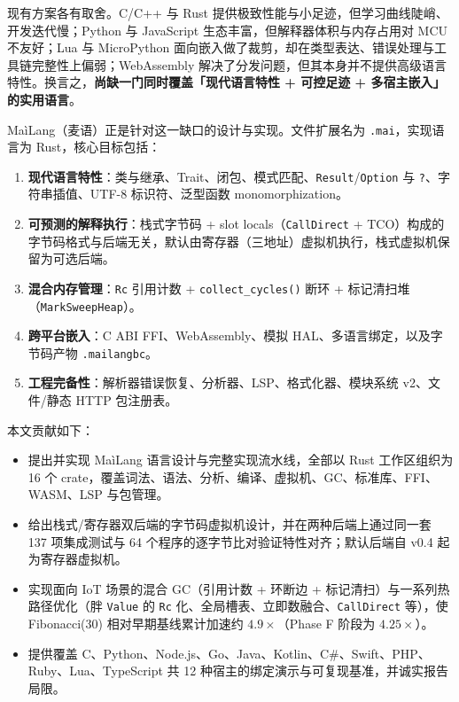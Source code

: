 \documentclass[10pt,a4paper]{article}
\begin{document}
现有方案各有取舍。C/C++ 与 Rust 提供极致性能与小足迹，但学习曲线陡峭、开发迭代慢；Python 与 JavaScript 生态丰富，但解释器体积与内存占用对 MCU 不友好；Lua 与 MicroPython 面向嵌入做了裁剪，却在类型表达、错误处理与工具链完整性上偏弱；WebAssembly 解决了分发问题，但其本身并不提供高级语言特性。换言之，\textbf{尚缺一门同时覆盖「现代语言特性 + 可控足迹 + 多宿主嵌入」的实用语言}。

MaìLang（麦语）正是针对这一缺口的设计与实现。文件扩展名为 \texttt{.mai}，实现语言为 Rust，核心目标包括：

\begin{enumerate}
  \item \textbf{现代语言特性}：类与继承、Trait、闭包、模式匹配、\texttt{Result}/\texttt{Option} 与 \texttt{?}、字符串插值、UTF-8 标识符、泛型函数 monomorphization。
  \item \textbf{可预测的解释执行}：栈式字节码 + slot locals（\texttt{CallDirect} + TCO）构成的字节码格式与后端无关，默认由寄存器（三地址）虚拟机执行，栈式虚拟机保留为可选后端。
  \item \textbf{混合内存管理}：\texttt{Rc} 引用计数 + \texttt{collect\_cycles()} 断环 + 标记清扫堆（\texttt{MarkSweepHeap}）。
  \item \textbf{跨平台嵌入}：C ABI FFI、WebAssembly、模拟 HAL、多语言绑定，以及字节码产物 \texttt{.mailangbc}。
  \item \textbf{工程完备性}：解析器错误恢复、分析器、LSP、格式化器、模块系统 v2、文件/静态 HTTP 包注册表。
\end{enumerate}

本文贡献如下：

\begin{itemize}
  \item 提出并实现 MaìLang 语言设计与完整实现流水线，全部以 Rust 工作区组织为 16 个 crate，覆盖词法、语法、分析、编译、虚拟机、GC、标准库、FFI、WASM、LSP 与包管理。
  \item 给出栈式/寄存器双后端的字节码虚拟机设计，并在两种后端上通过同一套 137 项集成测试与 64 个程序的逐字节比对验证特性对齐；默认后端自 v0.4 起为寄存器虚拟机。
  \item 实现面向 IoT 场景的混合 GC（引用计数 + 环断边 + 标记清扫）与一系列热路径优化（胖 \texttt{Value} 的 \texttt{Rc} 化、全局槽表、立即数融合、\texttt{CallDirect} 等），使 Fibonacci(30) 相对早期基线累计加速约 $4.9\times$（Phase F 阶段为 $4.25\times$）。
  \item 提供覆盖 C、Python、Node.js、Go、Java、Kotlin、C\#、Swift、PHP、Ruby、Lua、TypeScript 共 12 种宿主的绑定演示与可复现基准，并诚实报告局限。
\end{itemize}
\end{document}
